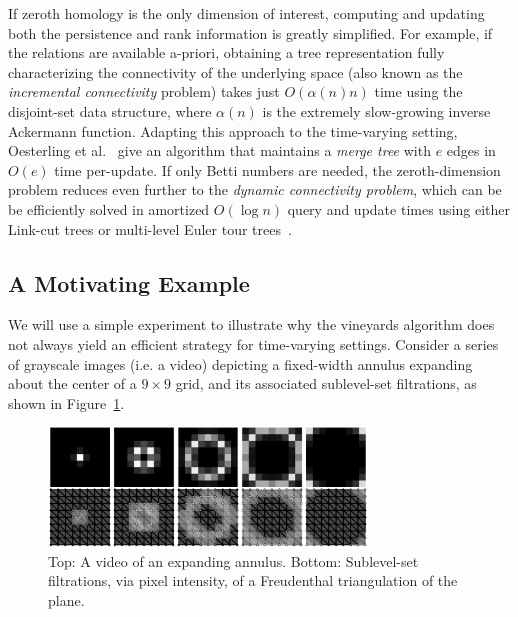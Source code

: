 \documentclass[sn-mathphys]{sn-jnl}
\begin{document}
If  zeroth homology   is the only dimension of interest, computing and updating both the persistence and rank information  is greatly simplified. For example, if the relations are available a-priori, obtaining a tree representation fully characterizing the connectivity of the underlying space (also known as the \emph{incremental connectivity} problem) takes just $O(\alpha(n) n)$ time using the disjoint-set data structure, where $\alpha(n)$ is the extremely slow-growing inverse Ackermann function. 
Adapting this approach to the time-varying setting, Oesterling et al.~\cite{oesterling2015computing} give an algorithm that maintains a \emph{merge tree} with $e$ edges in $O(e)$ time per-update.
If only Betti numbers are needed, the zeroth-dimension problem reduces even further to the \emph{dynamic connectivity problem}, which can be be efficiently solved in amortized $O(\log n)$ query and update times using either Link-cut trees or multi-level Euler tour trees~\cite{kapron2013dynamic}.
  
 \subsection{A Motivating Example}\label{sec:motivation} 
We  will use a simple experiment to illustrate why the vineyards algorithm does not always yield an efficient strategy for time-varying settings. 
Consider a series of grayscale images (i.e. a video) depicting a fixed-width annulus expanding about the center of a $9 \times 9$ grid, and its associated sublevel-set filtrations, as shown in Figure~\ref{fig:vidExample}.   

\begin{figure}[!htb]
    \centering
    \includegraphics[height=1.25in]{circle_complex.png}
    \caption{Top: A video of an expanding annulus. Bottom: Sublevel-set filtrations, via pixel intensity, of a Freudenthal triangulation of the plane.}
    \label{fig:vidExample}
\end{figure}
\end{document}
